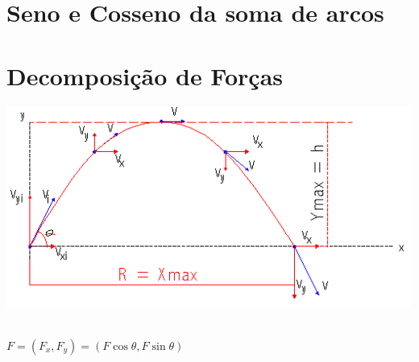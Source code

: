 \section{Seno e Cosseno da soma de arcos}



\section{Decomposição de Forças}

\begin{center}%
\includegraphics[scale=0.9]{./imagens/10.png}
\end{center}\\



$F=(F_x,F_y)=(F\cos \theta,F\sin \theta)$

